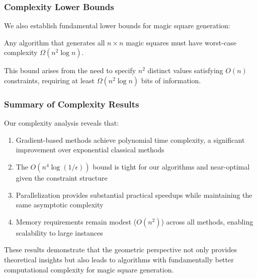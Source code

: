 \subsubsection{Complexity Lower Bounds}

We also establish fundamental lower bounds for magic square generation:

\begin{proposition}
Any algorithm that generates all $n \times n$ magic squares must have worst-case complexity $\Omega(n^2 \log n)$.
\end{proposition}

This bound arises from the need to specify $n^2$ distinct values satisfying $O(n)$ constraints, requiring at least $\Omega(n^2 \log n)$ bits of information.

\subsubsection{Summary of Complexity Results}

Our complexity analysis reveals that:
\begin{enumerate}
    \item Gradient-based methods achieve polynomial time complexity, a significant improvement over exponential classical methods
    \item The $O(n^4 \log(1/\epsilon))$ bound is tight for our algorithms and near-optimal given the constraint structure
    \item Parallelization provides substantial practical speedups while maintaining the same asymptotic complexity
    \item Memory requirements remain modest ($O(n^2)$) across all methods, enabling scalability to large instances
\end{enumerate}

These results demonstrate that the geometric perspective not only provides theoretical insights but also leads to algorithms with fundamentally better computational complexity for magic square generation. 